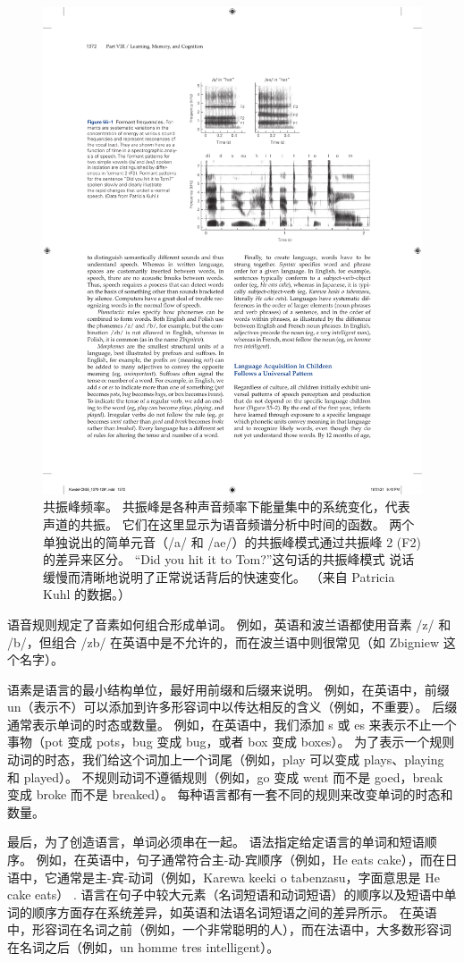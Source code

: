 \begin{figure}[htbp]
	\centering
	\includegraphics[width=0.7\linewidth]{chap55/fig_55_1}
	\caption{共振峰频率。 共振峰是各种声音频率下能量集中的系统变化，代表声道的共振。 它们在这里显示为语音频谱分析中时间的函数。 两个单独说出的简单元音（/a/ 和 /ae/）的共振峰模式通过共振峰 2 (F2) 的差异来区分。 “Did you hit it to Tom?”这句话的共振峰模式 说话缓慢而清晰地说明了正常说话背后的快速变化。 （来自 Patricia Kuhl 的数据。）}
	\label{fig:55_1}
\end{figure}

语音规则规定了音素如何组合形成单词。 例如，英语和波兰语都使用音素 /z/ 和 /b/，但组合 /zb/ 在英语中是不允许的，而在波兰语中则很常见（如 Zbigniew 这个名字）。

语素是语言的最小结构单位，最好用前缀和后缀来说明。 例如，在英语中，前缀 un（表示不）可以添加到许多形容词中以传达相反的含义（例如，不重要）。 后缀通常表示单词的时态或数量。 例如，在英语中，我们添加 s 或 es 来表示不止一个事物（pot 变成 pots，bug 变成 bug，或者 box 变成 boxes）。 为了表示一个规则动词的时态，我们给这个词加上一个词尾（例如，play 可以变成 plays、playing 和 played）。 不规则动词不遵循规则（例如，go 变成 went 而不是 goed，break 变成 broke 而不是 breaked）。 每种语言都有一套不同的规则来改变单词的时态和数量。

最后，为了创造语言，单词必须串在一起。 语法指定给定语言的单词和短语顺序。 例如，在英语中，句子通常符合主-动-宾顺序（例如，He eats cake），而在日语中，它通常是主-宾-动词（例如，Karewa keeki o tabenzasu，字面意思是 He cake eats） . 语言在句子中较大元素（名词短语和动词短语）的顺序以及短语中单词的顺序方面存在系统差异，如英语和法语名词短语之间的差异所示。 在英语中，形容词在名词之前（例如，一个非常聪明的人），而在法语中，大多数形容词在名词之后（例如，un homme tres intelligent）。

